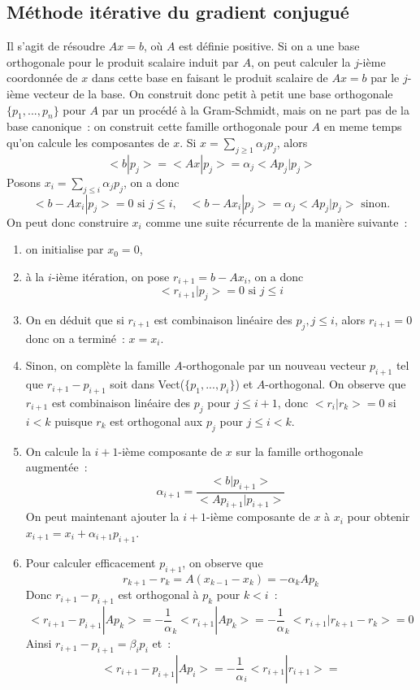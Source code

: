 \documentclass[a4paper,11pt]{book}
\begin{document}
\begin{giacjshere}
\subsection{M\'ethode it\'erative du gradient conjugu\'e}
Il s'agit de résoudre $Ax=b$, où $A$ est définie positive. 
Si on a une base orthogonale pour le produit scalaire induit par $A$, 
on peut calculer la $j$-ième coordonn\'ee de $x$ 
dans cette base en faisant le produit scalaire de 
$Ax=b$ par le $j$-ième vecteur de la base. 
On construit donc petit à petit une base orthogonale 
$\{ p_1,...,p_n \}$ pour $A$ par un procédé à la Gram-Schmidt, 
mais on ne part pas de la base canonique~: 
on construit cette famille orthogonale pour $A$ 
en meme temps qu'on calcule les composantes de $x$.
Si $x=\sum_{j\geq 1} \alpha_j p_j$, alors 
$$<b|p_j>=<Ax|p_j>=\alpha_j <Ap_j|p_j>$$
Posons $x_i=\sum_{j\leq i} \alpha_j p_j$, on a donc
$$<b-Ax_i|p_j>=0 \mbox{ si } j\leq i, \quad 
<b-Ax_i|p_j>=\alpha_j <Ap_j|p_j> \mbox{ sinon.}$$
On peut donc construire $x_i$ comme une suite r\'ecurrente de 
la mani\`ere suivante~: 
\begin{enumerate}
\item on initialise par $x_0=0$, 
\item à la $i$-ième itération, on pose $r_{i+1}=b-Ax_i$, on a donc
$$<r_{i+1}|p_j>=0 \mbox{ si } j\leq i $$
\item
On en d\'eduit que si $r_{i+1}$ est combinaison lin\'eaire des $p_j, j
\leq i$, alors $r_{i+1}=0$ donc on a terminé~: $x=x_i$.
\item
Sinon, on complète la famille $A$-orthogonale par un nouveau vecteur
$p_{i+1}$ tel que $r_{i+1}-p_{i+1}$ soit dans Vect($\{
p_1,...,p_{i}\}$) et $A$-orthogonal. On observe que $r_{i+1}$ est combinaison
lin\'eaire des $p_j$ pour $j \leq i+1$, donc $<r_i|r_k>=0$ si $i<k$
puisque $r_k$ est orthogonal aux $p_j$ pour $j \leq i <k$.
\item
On calcule la $i+1$-ième composante de $x$ 
sur la famille orthogonale augment\'ee~:
$$\alpha_{i+1}=\frac{<b|p_{i+1}>}{<Ap_{i+1}|p_{i+1}>}$$
On peut maintenant ajouter la $i+1$-i\`eme composante de $x$ à $x_i$ 
pour obtenir $x_{i+1}=x_i+\alpha_{i+1}p_{i+1}$. 
\item Pour calculer efficacement $p_{i+1}$, on observe que
$$ r_{k+1}-r_k=A(x_{k-1}-x_{k})=-\alpha_k A p_k$$
Donc $r_{i+1}-p_{i+1}$ est orthogonal \`a $p_k$ pour $k<i$~:
$$<r_{i+1}-p_{i+1}|Ap_k>=-\frac1\alpha_k<r_{i+1}|Ap_k>=-\frac1\alpha_k<r_{i+1}|r_{k+1}-r_k>=0$$
Ainsi $r_{i+1}-p_{i+1}=\beta_{i} p_i $ et~:
$$<r_{i+1}-p_{i+1}|Ap_i>=-\frac1\alpha_i<r_{i+1}|r_{i+1}>=
$$
\end{enumerate}
\end{giacjshere}
\end{document}
